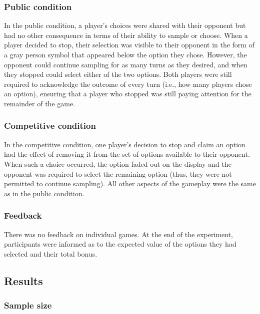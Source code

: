 \documentclass[11pt,jou]{apa6}
\begin{document}
\subsubsection{Public condition}

In the public condition, a player's choices were shared with their opponent but had no other consequence in terms of their ability to sample or choose.
When a player decided to stop, their selection was visible to their opponent in the form of a gray person symbol that appeared below the option they chose. 
However, the opponent could continue sampling for as many turns as they desired, and when they stopped could select either of the two options.
Both players were still required to acknowledge the outcome of every turn (i.e., how many players chose an option), ensuring that a player who stopped was still paying attention for the remainder of the game.




\subsubsection{Competitive condition}

In the competitive condition, one player's decision to stop and claim an option had the effect of removing it from the set of options available to their opponent.
When such a choice occurred, the option faded out on the display and the opponent was required to select the remaining option (thus, they were not permitted to continue sampling).
All other aspects of the gameplay were the same as in the public condition.

\subsubsection{Feedback}

There was no feedback on individual games.
At the end of the experiment, participants were informed as to the expected value of the options they had selected and their total bonus.



\subsection{Results}




\subsubsection{Sample size}
\end{document}
